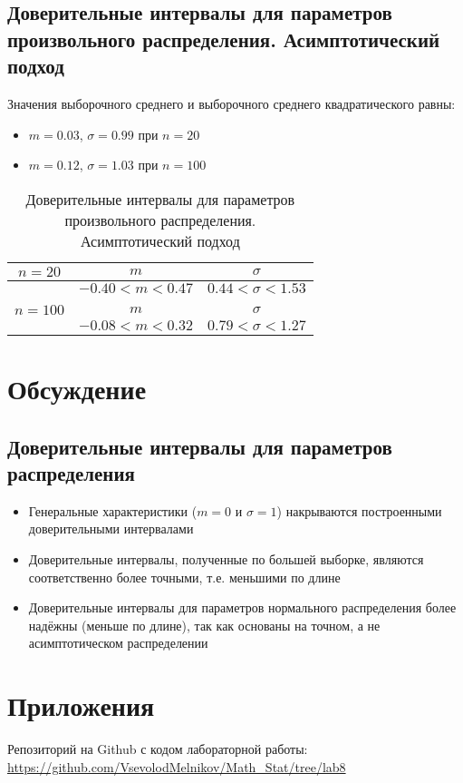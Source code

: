 \subsection{Доверительные интервалы для параметров произвольного распределения. Асимптотический подход}
Значения выборочного среднего и выборочного среднего квадратического равны:
\begin{itemize}
	\item $m=0.03$, $\sigma=0.99$ при $n=20$
	\item $m=0.12$, $\sigma=1.03$ при $n=100$
\end{itemize}
\begin{table}[!ht]
	\centering
		\begin{tabular} {|c|c|c|}
			\hline
			$n=20$ & $m$ & $\sigma$ \\ \hline
			 & $-0.40<m<0.47$ & $0.44<\sigma<1.53$ \\ \hline
			 & & \\ \hline
			$n=100$ & $m$ & $\sigma$ \\ \hline
			 & $-0.08<m<0.32$ & $0.79<\sigma<1.27$ \\ \hline
		\end{tabular}
		\caption{Доверительные интервалы для параметров произвольного распределения. Асимптотический подход}
\end{table}

\section{Обсуждение}
\subsection{Доверительные интервалы для параметров распределения}
\begin{itemize}
	\item Генеральные характеристики ($m=0$ и $\sigma=1$) накрываются построенными доверительными интервалами
	\item Доверительные интервалы, полученные по большей выборке, являются соответственно более точными, т.е. меньшими по длине
	\item Доверительные интервалы для параметров нормального распределения более надёжны (меньше по длине), так как основаны на точном, а не асимптотическом распределении
\end{itemize}

\section{Приложения}
Репозиторий на Github с кодом лабораторной работы:\\
\url{https://github.com/VsevolodMelnikov/Math_Stat/tree/lab8}

